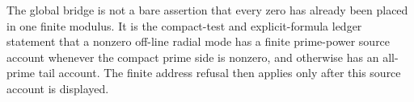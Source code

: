 \begin{principle}
\label{prin:rh-global-window-audit-boundary}
The global bridge is not a bare assertion that every zero has already
been placed in one finite modulus.  It is the compact-test and
explicit-formula ledger statement that a nonzero off-line radial mode
has a finite prime-power source account whenever the compact prime side
is nonzero, and otherwise has an all-prime tail account.  The finite
address refusal then applies only after this source account is
displayed.
\end{principle}
